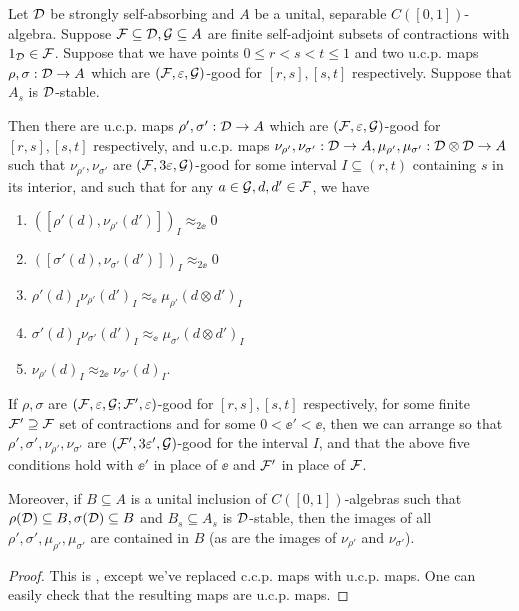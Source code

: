 \documentclass[12pt]{amsart}
\begin{document}
\begin{lemma}
Let $\mathcal{D}$ be strongly self-absorbing and $A$ be a unital, separable $C([0,1])$-algebra. Suppose $\mathcal{F} \subseteq \mathcal{D}, \mathcal{G} \subseteq A$ are finite self-adjoint subsets of contractions with $1_{\mathcal{D}} \in \mathcal{F}$. Suppose that we have points $0 \leq r < s < t \leq 1$ and two u.c.p. maps $\rho,\sigma: \mathcal{D} \to A$ which are $(\mathcal{F},\varepsilon,\mathcal{G})$-good for $[r,s],[s,t]$ respectively. Suppose that $A_s$ is $\mathcal{D}$-stable. 

Then there are u.c.p. maps $\rho',\sigma': \mathcal{D} \to A$ which are $(\mathcal{F},\varepsilon,\mathcal{G})$-good for $[r,s],[s,t]$ respectively, and u.c.p. maps $\nu_{\rho'},\nu_{\sigma'}: \mathcal{D} \to A,\mu_{\rho'},\mu_{\sigma'}: \mathcal{D} \otimes \mathcal{D} \to A$ such that $\nu_{\rho'},\nu_{\sigma'}$ are $(\mathcal{F},3\varepsilon,\mathcal{G})$-good for some interval $I \subseteq (r,t)$ containing $s$ in its interior, and such that for any $a \in \mathcal{G}, d,d' \in \mathcal{F}$, we have
\begin{enumerate}
\item $([\rho'(d),\nu_{\rho'}(d')])_I \approx_{2\ee} 0$
\item $([\sigma'(d),\nu_{\sigma'}(d')])_I \approx_{2\ee} 0$
\item $\rho'(d)_I\nu_{\rho'}(d')_I \approx_\ee \mu_{\rho'}(d \otimes d')_I$
\item $\sigma'(d)_I\nu_{\sigma'}(d')_I \approx_\ee \mu_{\sigma'}(d \otimes d')_I$
\item $\nu_{\rho'}(d)_I \approx_{2\ee} \nu_{\sigma'}(d)_I$.
\end{enumerate} 
If $\rho,\sigma$ are $(\mathcal{F},\varepsilon,\mathcal{G};\mathcal{F}',\varepsilon)$-good for $[r,s],[s,t]$ respectively, for some finite $\mathcal{F}' \supseteq \mathcal{F}$ set of contractions and for some $0 < \ee' < \ee$, then we can arrange so that $\rho',\sigma',\nu_{\rho'},\nu_{\sigma'}$ are $(\mathcal{F}',3\varepsilon',\mathcal{G})$-good for the interval $I$, and that the above five conditions hold with $\ee'$ in place of $\ee$ and $\mathcal{F}'$ in place of $\mathcal{F}$. 

Moreover, if $B \subseteq A$ is a unital inclusion of $C([0,1])$-algebras such that $\rho(\mathcal{D}) \subseteq B, \sigma(\mathcal{D}) \subseteq B$ and $B_s \subseteq A_s$ is $\mathcal{D}$-stable, then the images of all $\rho',\sigma',\mu_{\rho'},\mu_{\sigma'}$ are contained in $B$ (as are the images of $\nu_{\rho'}$ and $\nu_{\sigma'}$).
\begin{proof}
This is \cite[Lemma 4.4]{HirshbergRordamWinter07}, except we've replaced c.c.p. maps with u.c.p. maps. One can easily check that the resulting maps are u.c.p. maps. 


\end{proof}
\end{lemma}
\end{document}
